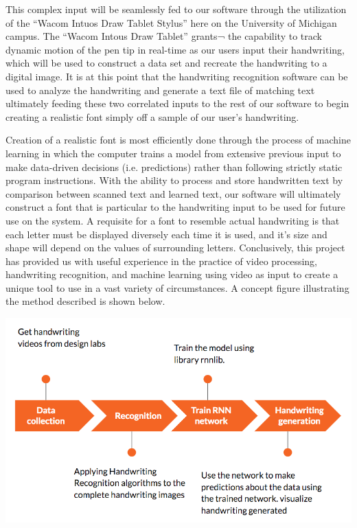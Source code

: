 \documentclass{article} %
\begin{document}
This complex input will be seamlessly fed to our software through the utilization of the “Wacom Intuos Draw Tablet  Stylus” here on the University of Michigan campus. The “Wacom Intous Draw Tablet” grants¬ the capability to track dynamic motion of the pen tip in real-time as our users input their handwriting, which will be used to construct a data set and recreate the handwriting to a digital image. It is at this point that the handwriting recognition software can be used to analyze the handwriting and generate a text file of matching text ultimately feeding these two correlated inputs to the rest of our software to begin creating a realistic font simply off a sample of our user’s handwriting. 

Creation of a realistic font is most efficiently done through the process of machine learning in which the computer trains a model from extensive previous input to make data-driven decisions (i.e. predictions) rather than following strictly static program instructions. With the ability to process and store handwritten text by comparison between scanned text and learned text, our software will ultimately construct a font that is particular to the handwriting input to be used for future use on the system. A requisite for a font to resemble actual handwriting is that each letter must be displayed diversely each time it is used, and it’s size and shape will depend on the values of surrounding letters. Conclusively, this project has provided us with useful experience in the practice of video processing, handwriting recognition, and machine learning using video as input to create a unique tool to use in a vast variety of circumstances. A concept figure illustrating the method described is shown below.

\begin{center}
\includegraphics[scale = 0.5]{Method.png}
\end{center}
\end{document}
